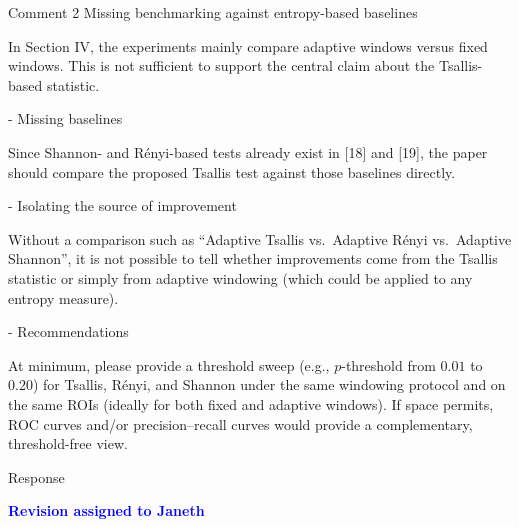 \documentclass[11pt]{report}
\newcommand{\assigned}[1]{\textcolor{blue}{\textbf{#1}}}
\begin{document}
\begin{reviewbox}{Comment 2}
Missing benchmarking against entropy-based baselines

In Section IV, the experiments mainly compare adaptive windows versus fixed windows. This is not sufficient to support the central claim about the Tsallis-based statistic.

- Missing baselines

Since Shannon- and Rényi-based tests already exist in [18] and [19], the paper should compare the proposed Tsallis test against those baselines directly.

- Isolating the source of improvement

Without a comparison such as ``Adaptive Tsallis vs.\ Adaptive Rényi vs.\ Adaptive Shannon'', it is not possible to tell whether improvements come from the Tsallis statistic or simply from adaptive windowing (which could be applied to any entropy measure).

- Recommendations

At minimum, please provide a threshold sweep (e.g., $p$-threshold from $0.01$ to $0.20$) for Tsallis, Rényi, and Shannon under the same windowing protocol and on the same ROIs (ideally for both fixed and adaptive windows). If space permits, ROC curves and/or precision--recall curves would provide a complementary, threshold-free view.
\end{reviewbox}

\begin{responsebox}{Response}

\assigned{Revision assigned to Janeth}

\end{responsebox}

\vspace{1em}
\end{document}
